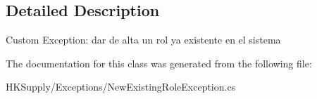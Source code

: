 \subsection{Detailed Description}
Custom Exception\+: dar de alta un rol ya existente en el sistema 



The documentation for this class was generated from the following file\+:\begin{DoxyCompactItemize}
\item 
H\+K\+Supply/\+Exceptions/New\+Existing\+Role\+Exception.\+cs\end{DoxyCompactItemize}
